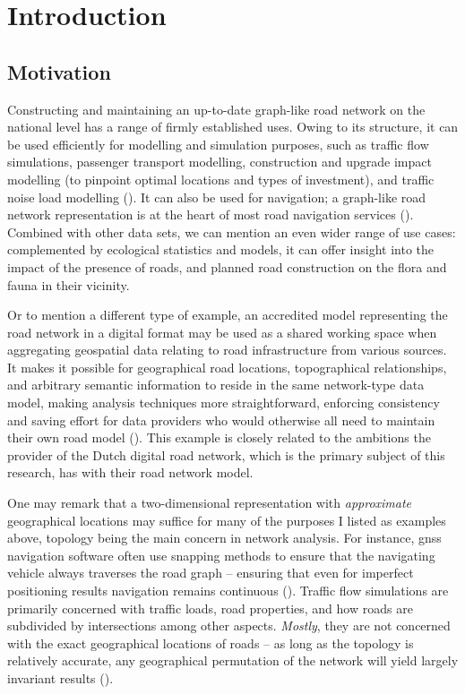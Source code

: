 
\chapter{Introduction}
\label{chap:i}

\section{Motivation}
\label{sec:motivation}

Constructing and maintaining an up-to-date graph-like road network on the national level has a range of firmly established uses. Owing to its structure, it can be used efficiently for modelling and simulation purposes, such as traffic flow simulations, passenger transport modelling, construction and upgrade impact modelling (to pinpoint optimal locations and types of investment), and traffic noise load modelling (\cite{bell_lida_1997, zhu_li_2007, zhang_2011, duran_santos_2014, peng_etal_2020}). It can also be used for navigation; a graph-like road network representation is at the heart of most road navigation services (\cite{yue_etal_2008}). Combined with other data sets, we can mention an even wider range of use cases: complemented by ecological statistics and models, it can offer insight into the impact of the presence of roads, and planned road construction on the flora and fauna in their vicinity.

Or to mention a different type of example, an accredited model representing the road network in a digital format may be used as a shared working space when aggregating geospatial data relating to road infrastructure from various sources. It makes it possible for geographical road locations, topographical relationships, and arbitrary semantic information to reside in the same network-type data model, making analysis techniques more straightforward, enforcing consistency and saving effort for data providers who would otherwise all need to maintain their own road model (\cite{ekpenyong_etal_2007}). This example is closely related to the ambitions the provider of the Dutch digital road network, which is the primary subject of this research, has with their road network model.

One may remark that a two-dimensional representation with \textit{approximate} geographical locations may suffice for many of the purposes I listed as examples above, topology being the main concern in network analysis. For instance, \ac{gnss} navigation software often use snapping methods to ensure that the navigating vehicle always traverses the road graph – ensuring that even for imperfect positioning results navigation remains continuous (\cite{fouque_bonnifait_2008, chen_hsu_2020}). Traffic flow simulations are primarily concerned with traffic loads, road properties, and how roads are subdivided by intersections among other aspects. \textit{Mostly}, they are not concerned with the exact geographical locations of roads – as long as the topology is relatively accurate, any geographical permutation of the network will yield largely invariant results (\cite{thomson_richardson_1995}).

